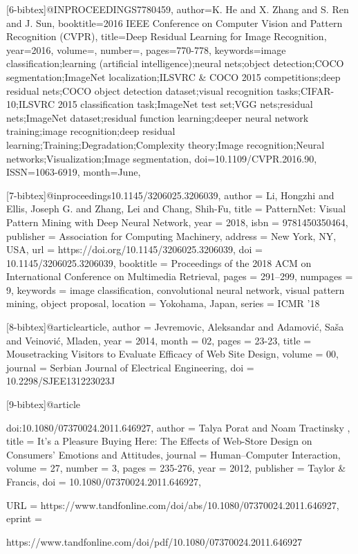 [6-bibtex]@INPROCEEDINGS{7780459,
author={K. {He} and X. {Zhang} and S. {Ren} and J. {Sun}},
booktitle={2016 IEEE Conference on Computer Vision and Pattern Recognition (CVPR)},
title={Deep Residual Learning for Image Recognition},
year={2016},
volume={},
number={},
pages={770-778},
keywords={image classification;learning (artificial intelligence);neural nets;object detection;COCO segmentation;ImageNet localization;ILSVRC & COCO 2015 competitions;deep residual nets;COCO object detection dataset;visual recognition tasks;CIFAR-10;ILSVRC 2015 classification task;ImageNet test set;VGG nets;residual nets;ImageNet dataset;residual function learning;deeper neural network training;image recognition;deep residual learning;Training;Degradation;Complexity theory;Image recognition;Neural networks;Visualization;Image segmentation},
doi={10.1109/CVPR.2016.90},
ISSN={1063-6919},
month={June},}

[7-bibtex]@inproceedings{10.1145/3206025.3206039,
author = {Li, Hongzhi and Ellis, Joseph G. and Zhang, Lei and Chang, Shih-Fu},
title = {PatternNet: Visual Pattern Mining with Deep Neural Network},
year = {2018},
isbn = {9781450350464},
publisher = {Association for Computing Machinery},
address = {New York, NY, USA},
url = {https://doi.org/10.1145/3206025.3206039},
doi = {10.1145/3206025.3206039},
booktitle = {Proceedings of the 2018 ACM on International Conference on Multimedia Retrieval},
pages = {291–299},
numpages = {9},
keywords = {image classification, convolutional neural network, visual pattern mining, object proposal},
location = {Yokohama, Japan},
series = {ICMR '18}
}
  

[8-bibtex]@article{article,
author = {Jevremovic, Aleksandar and Adamović, Saša and Veinović, Mladen},
year = {2014},
month = {02},
pages = {23-23},
title = {Mousetracking Visitors to Evaluate Efficacy of Web Site Design},
volume = {00},
journal = {Serbian Journal of Electrical Engineering},
doi = {10.2298/SJEE131223023J}
}

[9-bibtex]@article{doi:10.1080/07370024.2011.646927,
author = { Talya   Porat  and  Noam   Tractinsky },
title = {It's a Pleasure Buying Here: The Effects of Web-Store Design on Consumers' Emotions and Attitudes},
journal = {Human–Computer Interaction},
volume = {27},
number = {3},
pages = {235-276},
year  = {2012},
publisher = {Taylor & Francis},
doi = {10.1080/07370024.2011.646927},

URL = { https://www.tandfonline.com/doi/abs/10.1080/07370024.2011.646927},
eprint = { 
        https://www.tandfonline.com/doi/pdf/10.1080/07370024.2011.646927
    
}

}

